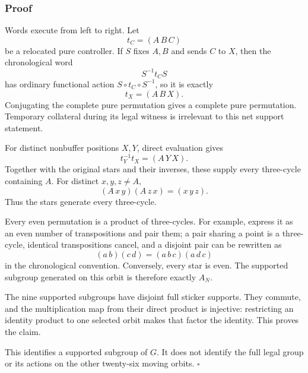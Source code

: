 \documentclass[
  10pt,
  a4paper,
]{article}
\begin{document}
\subsubsection{Proof}\label{proof-8}

Words execute from left to right. Let \begin{equation}
t_C=(A\,B\,C)
\end{equation} be a relocated pure controller. If \(S\) fixes \(A,B\)
and sends \(C\) to \(X\), then the chronological word \begin{equation}
S^{-1}t_CS
\end{equation} has ordinary functional action
\(S\circ t_C\circ S^{-1}\), so it is exactly \begin{equation}
t_X=(A\,B\,X).
\end{equation} Conjugating the complete pure permutation gives a
complete pure permutation. Temporary collateral during its legal witness
is irrelevant to this net support statement.

For distinct nonbuffer positions \(X,Y\), direct evaluation gives
\begin{equation}
t_Y^{-1}t_X=(A\,Y\,X).
\end{equation} Together with the original stars and their inverses,
these supply every three-cycle containing \(A\). For distinct
\(x,y,z\ne A\), \begin{equation}
(A\,x\,y)(A\,z\,x)=(x\,y\,z).
\end{equation} Thus the stars generate every three-cycle.

Every even permutation is a product of three-cycles. For example,
express it as an even number of transpositions and pair them; a pair
sharing a point is a three-cycle, identical transpositions cancel, and a
disjoint pair can be rewritten as \begin{equation}
(a\,b)(c\,d)=(a\,b\,c)(a\,d\,c)
\end{equation} in the chronological convention. Conversely, every star
is even. The supported subgroup generated on this orbit is therefore
exactly \(A_N\).

The nine supported subgroups have disjoint full sticker supports. They
commute, and the multiplication map from their direct product is
injective: restricting an identity product to one selected orbit makes
that factor the identity. This proves the claim.

This identifies a supported subgroup of \(G\). It does not identify the
full legal group or its actions on the other twenty-six moving orbits.
\(\square\)
\end{document}
